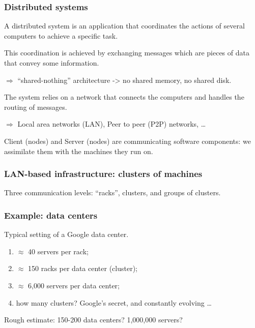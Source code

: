 \documentclass{beamer}
\begin{document}
\begin{frame}
\frametitle{Distributed systems}

A \alert{distributed system} is an application that coordinates the actions of
  several computers to achieve a specific task. 
  
  \vfill
  This coordination is achieved by exchanging \alert{messages}
  which are  pieces of data that convey
   some information. 
   
   $\Rightarrow$ ``shared-nothing'' architecture -> no shared memory, no shared
   disk.
   
   \vfill 
   
   The system relies on a network that connects the
   computers and handles the routing of messages.
   
   $\Rightarrow$ Local area networks (LAN), Peer to peer (P2P) networks, \ldots
    
    \vfill
    
    \alert{Client} (nodes) and \alert{Server} (nodes) are communicating
    \alert{software} components: we assimilate them with the machines they run
    on.
\end{frame}

\begin{frame}
\frametitle{LAN-based infrastructure: clusters of machines}

Three communication levels: ``racks'', clusters, and groups of clusters. 


\end{frame}


\begin{frame}
\frametitle{Example: data centers}

Typical setting of a Google data center.

\begin{enumerate}
  \item $\approx$ 40 servers per rack;
  \item $\approx$ 150 racks per data center (cluster);

  \item $\approx$ 6,000 servers per data center;
    \item how many clusters? Google's secret, and constantly evolving \ldots
\end{enumerate}

Rough estimate: 150-200 data centers? 1,000,000 servers? 

\end{frame}
\end{document}
